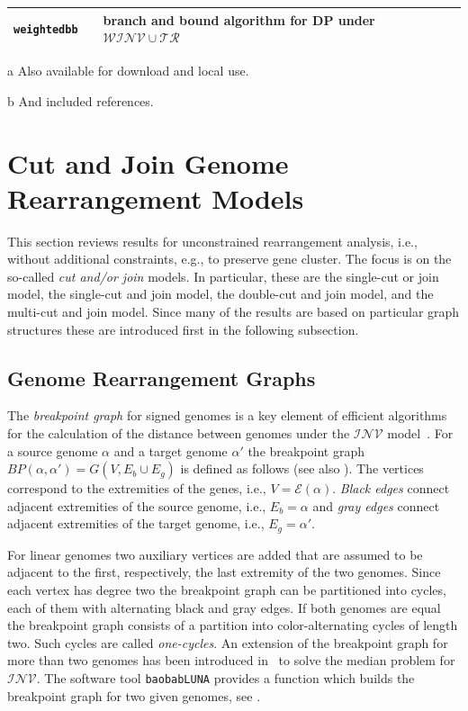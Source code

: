 \documentclass{svmult}
\newcommand{\m}[1]{\mathcal{#1}}
\begin{document}
\begin{table}
\begin{center}
\begin{threeparttable}
\begin{tabular}{l l p{7.2cm}}
    \texttt{weightedbb} & \cite{Bader_2008,PHYLO}\tnote{b} & branch and
    bound algorithm for DP under $\m{WINV}\cup\m{TR}$\\
    \hline
  \end{tabular}
  \label{table:tools}
  \begin{tablenotes}
    \item[a] Also available for download and local use.
    \item[b] And included references.
\end{tablenotes}
\end{threeparttable}
\end{center}
\end{table}


\section{Cut and Join Genome Rearrangement Models}
\label{sec:x-cut}
%
This section reviews results for unconstrained rearrangement analysis, i.e., 
without additional constraints, e.g., to preserve gene cluster. The focus is on the so-called \emph{cut and/or join} models. 
In particular, these are the single-cut or join model, the single-cut and join model, the double-cut and join model, and the multi-cut 
and join model.
%
Since many of the results are based on particular graph structures these are 
introduced first in the following subsection.

\subsection{Genome Rearrangement Graphs}

The \emph{breakpoint graph} for signed genomes is a key element of efficient
algorithms for the calculation of the distance between genomes under the
$\m{INV}$ model~\cite{Hannenhalli_1999}.
%
For a source genome $\alpha$ and a target genome $\alpha'$ the breakpoint graph
$BP(\alpha,\alpha') = G(V,E_b \cup E_g)$ is defined as follows (see also 
). The vertices correspond to the
extremities of the genes, i.e., $V=\m{E}(\alpha)$. \emph{Black edges} connect
adjacent extremities of the source genome, i.e., $E_b=\alpha$ and \emph{gray edges} connect adjacent extremities of the target
genome, i.e., $E_g=\alpha'$.


%
For linear genomes two auxiliary vertices are added that are assumed to be
adjacent to the first, respectively, the last extremity of the two genomes.
Since each vertex has degree two the breakpoint graph can be 
partitioned into cycles, each of them with alternating black and gray edges. 
%
If both genomes are equal the breakpoint graph consists of a partition into color-alternating cycles of length two. 
Such cycles are called \emph{one-cycles}.
%
An extension of the breakpoint graph for more than two genomes has been
introduced in~\cite{Caprara_2003} to solve the median problem for $\m{INV}$.
%
The software tool \texttt{baobabLUNA} provides a function which builds the
breakpoint graph for two given genomes, see .
\end{document}

